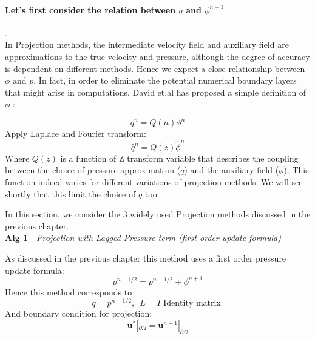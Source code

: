 \paragraph*{Let's first consider the relation between $q$ and $\phi^{n+1}$}.\\
In Projection methods, the intermediate velocity field and auxiliary field are approximations to the true velocity and pressure, although the degree of accuracy is dependent on different methods. Hence we expect a close relationship between $\phi$ and $p$. In fact, in order to eliminate the potential numerical boundary layers that might arise in computations, David et.al has proposed a simple definition of $\phi$ \cite{brown2001accurate}:
\begin{mydef}\label{definition of q and phi in normal mode analysis}
\begin{equation*}
q^n = Q(n) \phi^n
\end{equation*}
Apply Laplace and Fourier transform:
\begin{equation}\label{eq:relation between transfromed q and phi}
\hat{q}^n = Q(z) \hat{\phi}^n
\end{equation}
Where $Q(z)$ is a function of Z transform variable that describes the coupling between the choice of pressure approximation ($q$) and the auxiliary field ($\phi$). This function indeed varies for different variations of projection methods. We will see shortly that this limit the choice of $q$ too.
\end{mydef}
In this section, we consider the 3 widely used Projection methods discussed in the previous chapter.\\

\textbf{Alg 1} - \emph{Projection with Lagged Pressure term (first order update formula)}

As discussed in the previous chapter this method uses a first order pressure update formula:
\begin{equation*}
p^{n+1/2} = p^{n-1/2} + \phi^{n+1}
\end{equation*}
Hence this method corresponds to
\begin{equation*}
q = p^{n-1/2}, \, \, \, L = I \text{   Identity matrix   }
\end{equation*}
And boundary condition for projection:
\begin{equation*}
\textbf{u}^* |_{\partial \Omega} = \textbf{u}^{n+1} |_{\partial \Omega}
\end{equation*}\\

